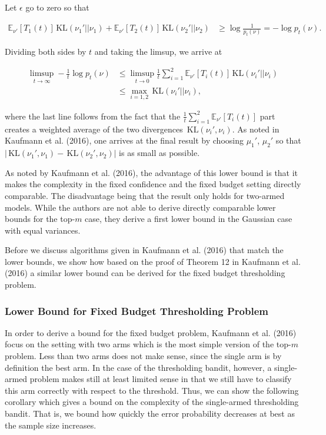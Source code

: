 \documentclass[11pt,]{article}
\newcommand{\KL}{\,\text{KL}}
\begin{document}
Let \(\epsilon\) go to zero so that

\begin{align*}
\mathbb{E}_{\nu'}[T_1(t)]\KL(\nu_1' || \nu_1) + \mathbb{E}_{\nu'}[T_2(t)]\KL(\nu_2' || \nu_2)
& \geq \log \frac{1}{p_t(\nu)} = -\log p_t(\nu).
\end{align*}

Dividing both sides by \(t\) and taking the limsup, we arrive at

\begin{align*}
\limsup_{t \to \infty} - \frac{1}{t} \log p_t(\nu)
& \leq \limsup_{t \to 0} \frac{1}{t} \sum_{i=1}^2 \mathbb{E}_{\nu'}[T_i(t)] \KL(\nu_i' || \nu_i) \\
& \leq \max_{i=1,2} \KL(\nu_i' || \nu_i),
\end{align*}

where the last line follows from the fact that the
\(\frac{1}{t} \sum_{i=1}^2 \mathbb{E}_{\nu'}[T_i(t)]\) part creates a
weighted average of the two divergences \(\KL(\nu_i', \nu_i)\). As noted
in Kaufmann et al. (2016), one arrives at the final result by choosing
\(\mu_1'\), \(\mu_2'\) so that
\(| \KL(\nu_1', \nu_1) - \KL(\nu_2', \nu_2) |\) is as small as possible.

As noted by Kaufmann et al. (2016), the advantage of this lower bound is
that it makes the complexity in the fixed confidence and the fixed
budget setting directly comparable. The disadvantage being that the
result only holds for two-armed models. While the authors are not able
to derive directly comparable lower bounds for the top-\(m\) case, they
derive a first lower bound in the Gaussian case with equal variances.

Before we discuss algorithms given in Kaufmann et al. (2016) that match
the lower bounds, we show how based on the proof of Theorem 12 in
Kaufmann et al. (2016) a similar lower bound can be derived for the
fixed budget thresholding problem.

\subsubsection{\texorpdfstring{Lower Bound for Fixed Budget Thresholding
Problem
\label{sec:LBTBP}}{Lower Bound for Fixed Budget Thresholding Problem }}\label{lower-bound-for-fixed-budget-thresholding-problem}

In order to derive a bound for the fixed budget problem, Kaufmann et al.
(2016) focus on the setting with two arms which is the most simple
version of the top-\(m\) problem. Less than two arms does not make
sense, since the single arm is by definition the best arm. In the case
of the thresholding bandit, however, a single-armed problem makes still
at least limited sense in that we still have to classify this arm
correctly with respect to the threshold. Thus, we can show the following
corollary which gives a bound on the complexity of the single-armed
thresholding bandit. That is, we bound how quickly the error probability
decreases at best as the sample size increases.
\end{document}
